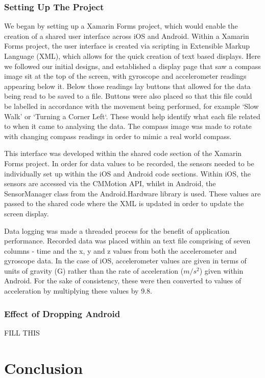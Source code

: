 \documentclass[12pt,a4paper]{report}
\begin{document}

\subsection{Setting Up The Project}

We began by setting up a Xamarin Forms project, which would enable the creation of a shared user interface across iOS and Android. Within a Xamarin Forms project, the user interface is created via scripting in Extensible Markup Language (XML), which allows for the quick creation of text based displays. Here we followed our initial designs, and established a display page that saw a compass image sit at the top of the screen, with gyroscope and accelerometer readings appearing below it. Below those readings lay buttons that allowed for the data being read to be saved to a file. Buttons were also placed so that this file could be labelled in accordance with the movement being performed, for example `Slow Walk' or `Turning a Corner Left`.  These would help identify what each file related to when it came to analysing the data. The compass image was made to rotate with changing compass readings in order to mimic a real world compass.

This interface was developed within the shared code section of the Xamarin Forms project. In order for data values to be recorded, the sensors needed to be individually set up within the iOS and Android code sections. Within iOS, the sensors are accessed via the CMMotion API, whilst in Android, the SensorManager class from the Android.Hardware library is used. These values are passed to the shared code where the XML is updated in order to update the screen display.

Data logging was made a threaded process for the benefit of application performance. Recorded data was placed within an text file comprising of seven columns - time and the x, y and z values from both the accelerometer and gyroscope data. In the case of iOS, accelerometer values are given in terms of units of gravity (G) rather than the rate of acceleration ($m/s^2$) given within Android. For the sake of consistency, these were then converted to values of acceleration by multiplying these values by 9.8.

\subsection{Effect of Dropping Android}
FILL THIS

\chapter{Conclusion}

\nocite{*}



\end{document}
